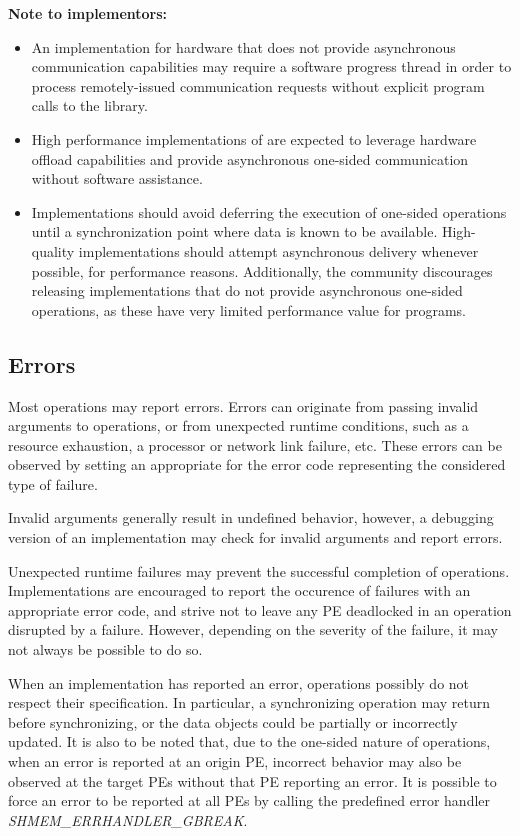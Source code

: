 \textbf{Note to implementors:}
\begin{itemize}
  \item An \openshmem implementation for hardware that does not provide
      asynchronous communication capabilities may require a software progress
      thread in order to process remotely-issued communication requests without
      explicit program calls to the \openshmem library.
  \item High performance implementations of \openshmem are expected to leverage
      hardware offload capabilities and provide asynchronous one-sided
      communication without software assistance.
  \item Implementations should avoid deferring the execution of one-sided
      operations until a synchronization point where data is known to be
      available. High-quality implementations should attempt asynchronous delivery
      whenever possible, for performance reasons. Additionally, the \openshmem
      community discourages releasing \openshmem implementations that do not
      provide asynchronous one-sided operations, as these have very limited
      performance value for \openshmem programs.
\end{itemize}

\subsection{Errors}\label{sec:errors}

Most \openshmem operations may report errors. Errors can originate from
passing invalid arguments to \openshmem operations, or from
unexpected runtime conditions, such as a resource exhaustion, a processor
or network link failure, etc. These errors can be observed by setting an
appropriate  for the error code representing the
considered type of failure.

Invalid arguments generally result in undefined behavior, however, a
debugging version of an \openshmem implementation may check for invalid
arguments and report errors.

Unexpected runtime failures may prevent the successful completion of \openshmem
operations. Implementations are encouraged to report the occurence of failures
with an appropriate error code, and strive not to leave any \ac{PE} deadlocked
in an operation disrupted by a failure. However, depending on the severity of
the failure, it may not always be possible to do so.

When an \openshmem implementation has reported an error, operations possibly do
not respect their specification. In particular, a synchronizing operation may
return before synchronizing, or the data objects could be partially
or incorrectly updated. It is also to be noted that, due to the one-sided
nature of \openshmem operations, when an error is reported at
an origin \ac{PE}, incorrect behavior may also be observed at
the target \acp{PE} without that \ac{PE} reporting an error. It is possible
to force an error to be reported at all \acp{PE} by calling the predefined
error handler \textit{SHMEM\_ERRHANDLER\_GBREAK}.

